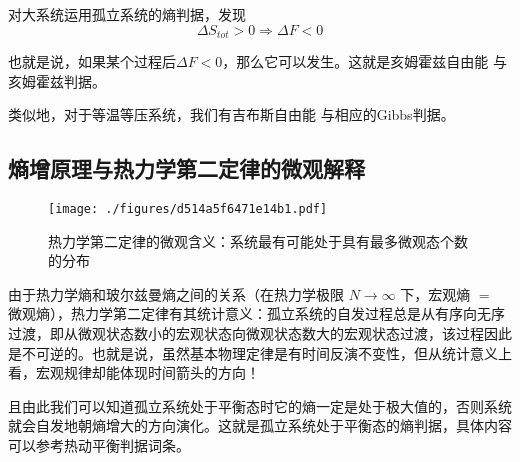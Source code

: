 对大系统运用孤立系统的熵判据，发现
\begin{equation}
\Delta S_{tot} > 0\Rightarrow \Delta F < 0
\end{equation}

也就是说，如果某个过程后$\Delta F < 0$，那么它可以发生。这就是亥姆霍兹自由能 与 亥姆霍兹判据。

类似地，对于等温等压系统，我们有吉布斯自由能 与相应的Gibbs判据。

\subsection{熵增原理与热力学第二定律的微观解释}
\begin{figure}[ht]
\centering
\texttt{[image: ./figures/d514a5f6471e14b1.pdf]}
\caption{热力学第二定律的微观含义：系统最有可能处于具有最多微观态个数的分布} \label{fig_Td2Law_4}
\end{figure}
由于热力学熵和玻尔兹曼熵之间的关系（在热力学极限 $N\rightarrow \infty$ 下，宏观熵 $=$ 微观熵），热力学第二定律有其统计意义：孤立系统的自发过程总是从有序向无序过渡，即从微观状态数小的宏观状态向微观状态数大的宏观状态过渡，该过程因此是不可逆的。也就是说，虽然基本物理定律是有时间反演不变性，但从统计意义上看，宏观规律却能体现时间箭头的方向！

且由此我们可以知道孤立系统处于平衡态时它的熵一定是处于极大值的，否则系统就会自发地朝熵增大的方向演化。这就是孤立系统处于平衡态的熵判据，具体内容可以参考热动平衡判据词条。
